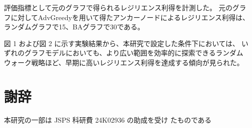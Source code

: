 \documentclass[twocolumn,a4paper, dvipdfmx]{ieicejsp}
\begin{document}
評価指標として元のグラフで得られるレジリエンス利得を計測した。
元のグラフに対してAdvGreedyを用いて得たアンカーノードによるレジリエンス利得は、
ランダムグラフで15、BAグラフで30である。


図 1 および図 2 に示す実験結果から、本研究で設定した条件下においては、
いずれのグラフモデルにおいても、より広い範囲を効率的に探索できるランダム
ウォーク戦略ほど、早期に高いレジリエンス利得を達成する傾向が見られた。

\section*{謝辞}
本研究の一部は JSPS 科研費 24K02936 の助成を受け
たものである

\renewcommand{\em}{\it}


\end{document}

